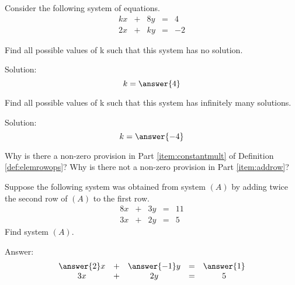 \documentclass{ximera}
\begin{document}
  \begin{problem}
  Consider the following system of equations.
  $$\begin{array}{ccccc}
      kx & +&8y&= &4 \\
	 2x& +&ky&=&-2
    \end{array}$$
     \begin{problem}\label{prob:sysnosolfindk}
Find all possible values of k such that this system has no solution.

Solution: $$k=\answer{4}$$
  \end{problem}
     \begin{problem}\label{prob:sysinfmanysolfindk}
Find all possible values of k such that this system has infinitely many solutions.

Solution: $$k=\answer{-4}$$
  \end{problem}
  \end{problem}

\begin{problem}\label{prob:nonzeroprovision}
Why is there a non-zero provision in Part \ref{item:constantmult} of Definition \ref{def:elemrowops}?  Why is there not a non-zero provision in Part \ref{item:addrow}?
\end{problem}

\begin{problem}\label{prob:reverseelemrowops}
Suppose the following system was obtained from system $(A)$ by adding twice the second row of $(A)$ to the first row.
$$\begin{array}{ccccc}
      8x &+ &3y&= &11\\
      3x&+ &2y&=&5      
    \end{array}$$
    Find system $(A)$.
    
    Answer:
    $$\begin{array}{ccccc}
      \answer{2}x &+ &\answer{-1}y&= &\answer{1}\\
      3x&+ &2y&=&5      
    \end{array}$$
    
\end{problem}
\end{document}
